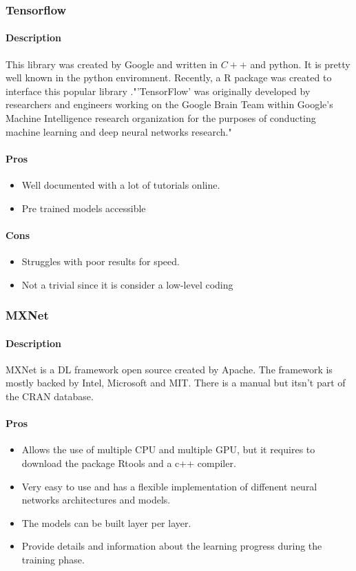\documentclass[letter]{article}\usepackage[]{graphicx}\usepackage[]{color}
\begin{document}
\subsubsection{Tensorflow}
\paragraph{Description}
This library was created by Google and written in $C++$ and python. It is pretty well known in the python enviromnent. Recently, a R package was created to interface this popular library \cite{tensorflow2019}."'TensorFlow' was originally developed by researchers and engineers working on the Google Brain Team within Google's Machine Intelligence research organization for the purposes of conducting machine learning and deep neural networks research."
\paragraph{Pros}
\begin{itemize}
\item Well documented with a lot of tutorials online.
\item Pre trained models accessible
\end{itemize}

\paragraph{Cons}
\begin{itemize}
\item Struggles with poor results for speed.
\item Not a trivial since it is consider a low-level coding
\end{itemize}

\subsubsection{MXNet}
\paragraph{Description}
MXNet is a DL framework open source created by Apache. The framework is mostly backed by Intel, Microsoft and MIT. There is a manual\cite{mxnet2020} but itsn't part of the CRAN database.
\paragraph{Pros}
\begin{itemize}
\item Allows the use of multiple CPU and multiple GPU, but it requires to download the package Rtools and a c++ compiler.
\item Very easy to use and has a flexible implementation of diffenent neural networks architectures and models.
\item The models can be built layer per layer.
\item Provide details and information about the learning progress during the training phase.
\end{itemize}
\end{document}
